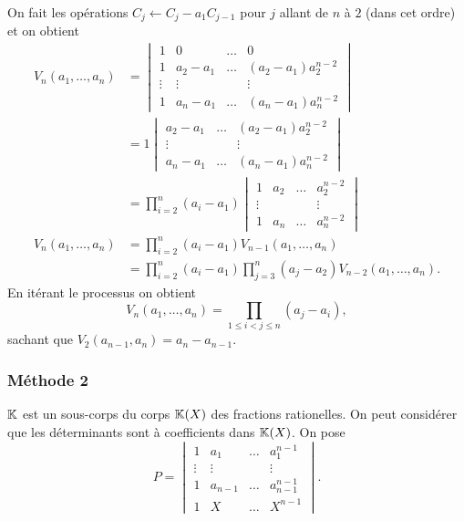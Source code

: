 On fait les opérations \( C_j \leftarrow C_j - a_1C_{j-1}\) pour \(j\) 
allant de \(n\) à \(2\) (dans cet ordre) et on obtient
\begin{align}
  V_n(a_1, \ldots, a_n) &=
  \begin{vmatrix}
    1 & 0 & \ldots & 0 \\
    1 & a_2-a_1 & \ldots & (a_2-a_1)a_2^{n-2} \\
    \vdots & \vdots &  & \vdots \\
    1 & a_n-a_1 & \ldots & (a_n-a_1)a_n^{n-2}
  \end{vmatrix}\\
  &=1
  \begin{vmatrix}
    a_2-a_1 & \ldots & (a_2-a_1)a_2^{n-2} \\
    \vdots &  & \vdots \\
    a_n-a_1 & \ldots & (a_n-a_1)a_n^{n-2}
  \end{vmatrix}\\
  &=\prod_{i=2}^n(a_i-a_1)
  \begin{vmatrix}
    1 & a_2 &\ldots & a_2^{n-2} \\
    \vdots & & & \vdots \\
    1 & a_n &\ldots & a_n^{n-2}
  \end{vmatrix}\\
  V_n(a_1, \ldots, a_n)  &=\prod_{i=2}^n(a_i-a_1) V_{n-1}(a_1, \ldots, 
  a_n) \\
  &=\prod_{i=2}^n(a_i-a_1) \prod_{j=3}^n(a_j-a_2) V_{n-2}(a_1, \ldots, 
  a_n).
\end{align}
En itérant le processus on obtient
\begin{equation}
  V_n(a_1, \ldots, a_n) = \prod_{1 \le i < j \leqslant n} (a_j-a_i),
\end{equation}
sachant que \(V_2(a_{n-1},a_n)=a_n-a_{n-1}\).

\subsubsection{Méthode 2}

\(\mathbb{K}\) est un sous-corps du corps \(\mathbb{K}(X)\) des fractions rationelles. On 
peut considérer que les déterminants sont à coefficients dans \(\mathbb{K}(X)\). 
On pose
\begin{equation}
  P = \begin{vmatrix}
    1 & a_1 & \ldots & a_1^{n-1} \\
    \vdots & \vdots &  & \vdots \\
    1 & a_{n-1} & \ldots & a_{n-1}^{n-1}\\
    1 & X     & \ldots & X^{n-1}
  \end{vmatrix}.
\end{equation}

